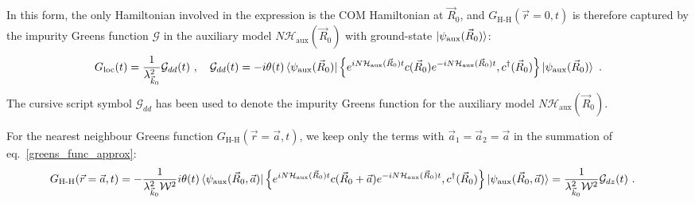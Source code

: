 \documentclass{report}
\numberwithin{equation}{section}
\begin{document}
In this form, the only Hamiltonian involved in the expression is the COM Hamiltonian at \(\vec R_0\), and \(G_\text{H-H}(\vec r=0, t)\) is therefore captured by the impurity Greens function \(\mathcal{G}\) in the auxiliary model \(N \mathcal{H}_\text{aux}(\vec R_0)\) with ground-state \(\ket{\psi_\text{aux}(\vec R_0)}\):
\begin{equation}\begin{aligned}
	\label{greens_func_relation}
	G_\text{loc}(t) = \frac{1}{\lambda_{\vec k_0}^2}\mathcal{G}_{dd}(t)~,\quad \mathcal{G}_{dd}(t) = -i\theta(t) \braket{\psi_\text{aux}(\vec R_0) | \left\{ e^{i N \mathcal{H}_\text{aux}(\vec R_0) t}c(\vec R_0)e^{-i N \mathcal{H}_\text{aux}(\vec R_0) t}, c^\dagger(\vec R_0) \right\} | \psi_\text{aux}(\vec R_0)}~.
\end{aligned}\end{equation}
The cursive script symbol \(\mathcal{G}_{dd}\) has been used to denote the impurity Greens function for the auxiliary model \(N \mathcal{H}_\text{aux}(\vec R_0)\).

For the nearest neighbour Greens function \(G_\text{H-H}(\vec r=\vec a, t)\), we keep only the terms with \(\vec a_1 = \vec a_2 = \vec a\) in the summation of eq.~\ref{greens_func_approx}:
\begin{equation}\begin{aligned}
	G_\text{H-H}(\vec r=\vec a, t) &= -\frac{1}{\lambda_{\vec k_0}^2 \mathcal{W}^2}i\theta(t) \braket{\psi_\text{aux}(\vec R_0, \vec a) | \left\{ e^{i N \mathcal{H}_\text{aux}(\vec R_0) t}c(\vec R_0 + \vec a)e^{-i N \mathcal{H}_\text{aux}(\vec R_0) t}, c^\dagger(\vec R_0) \right\} | \psi_\text{aux}(\vec R_0, \vec a)} = \frac{1}{\lambda_{\vec k_0}^2 \mathcal{W}^2} \mathcal{G}_{dz}(t)~.
\end{aligned}\end{equation}
\end{document}
